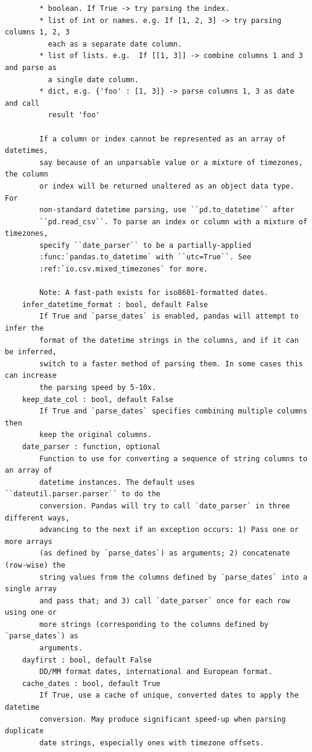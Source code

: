 \documentclass[
  letterpaper,
]{book}
\begin{document}
\begin{verbatim}
        * boolean. If True -> try parsing the index.
        * list of int or names. e.g. If [1, 2, 3] -> try parsing columns 1, 2, 3
          each as a separate date column.
        * list of lists. e.g.  If [[1, 3]] -> combine columns 1 and 3 and parse as
          a single date column.
        * dict, e.g. {'foo' : [1, 3]} -> parse columns 1, 3 as date and call
          result 'foo'

        If a column or index cannot be represented as an array of datetimes,
        say because of an unparsable value or a mixture of timezones, the column
        or index will be returned unaltered as an object data type. For
        non-standard datetime parsing, use ``pd.to_datetime`` after
        ``pd.read_csv``. To parse an index or column with a mixture of timezones,
        specify ``date_parser`` to be a partially-applied
        :func:`pandas.to_datetime` with ``utc=True``. See
        :ref:`io.csv.mixed_timezones` for more.

        Note: A fast-path exists for iso8601-formatted dates.
    infer_datetime_format : bool, default False
        If True and `parse_dates` is enabled, pandas will attempt to infer the
        format of the datetime strings in the columns, and if it can be inferred,
        switch to a faster method of parsing them. In some cases this can increase
        the parsing speed by 5-10x.
    keep_date_col : bool, default False
        If True and `parse_dates` specifies combining multiple columns then
        keep the original columns.
    date_parser : function, optional
        Function to use for converting a sequence of string columns to an array of
        datetime instances. The default uses ``dateutil.parser.parser`` to do the
        conversion. Pandas will try to call `date_parser` in three different ways,
        advancing to the next if an exception occurs: 1) Pass one or more arrays
        (as defined by `parse_dates`) as arguments; 2) concatenate (row-wise) the
        string values from the columns defined by `parse_dates` into a single array
        and pass that; and 3) call `date_parser` once for each row using one or
        more strings (corresponding to the columns defined by `parse_dates`) as
        arguments.
    dayfirst : bool, default False
        DD/MM format dates, international and European format.
    cache_dates : bool, default True
        If True, use a cache of unique, converted dates to apply the datetime
        conversion. May produce significant speed-up when parsing duplicate
        date strings, especially ones with timezone offsets.


\end{verbatim}
\end{document}
